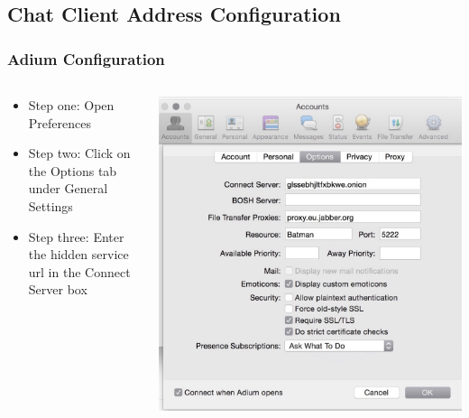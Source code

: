 \documentclass{beamer}
\begin{document}
\subsection{Chat Client Address Configuration}
\begin{frame}
\frametitle{Adium Configuration}
\begin{columns}
    \begin{column}{0.48\textwidth}
        \begin{itemize}
          \item Step one: Open Preferences
	 \item Step two: Click on the Options tab under General Settings
          \item Step three: Enter the hidden service url in the Connect Server box
        \end{itemize}
    \end{column}
    \begin{column}{.5\textwidth}
        \includegraphics[width=.9\linewidth]{adium1}
    \end{column}
\end{columns}
\end{frame}
\end{document}
